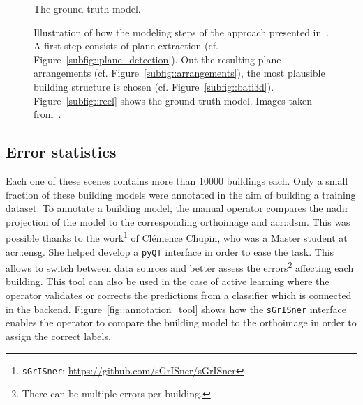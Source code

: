 \begin{figure}[htb]
{\begin{subfloatrow}
{                    }{
                        \caption{
                            \label{subfig::reel}
                            The ground truth model.
                        }
                    }
                \end{subfloatrow}
            }{
                \caption[
                    Illustration of how the modeling steps of the approach presented in~\parencite{durupt2006automatic}.
                ]{
                    \label{fig::method_modeling}
                    Illustration of how the modeling steps of the approach presented in~\parencite{durupt2006automatic}.
                    A first step consists of plane extraction (cf. Figure~\ref{subfig::plane_detection}).
                    Out the resulting plane arrangements (cf. Figure~\ref{subfig::arrangements}), the most plausible building structure is chosen (cf. Figure~\ref{subfig::bati3d}).
                    Figure~\ref{subfig::reel} shows the ground truth model.
                    Images taken from~\parencite{bredif20103d}.
                }
            }
        \end{figure}

    \subsection{Error statistics}
        \label{subsec::experiments::datasets::stats}
        Each one of these scenes contains more than \num{10000} buildings each.
        Only a small fraction of these building models were annotated in the aim of building a training dataset.
        To annotate a building model, the manual operator compares the nadir projection of the model to the corresponding orthoimage and \gls{acr::dsm}.
        This was possible thanks to the work\footnote{\verb!sGrISner!: \href{https://github.com/CHUPClem/sGrISner}{\url{https://github.com/sGrISner/sGrISner}}} of Clémence Chupin, who was a Master student at \gls{acr::ensg}.
        She helped develop a \verb!pyQT! interface in order to ease the task.
        This allows to switch between data sources and better assess the errors\footnote{There can be multiple errors per building.} affecting each building.
        This tool can also be used in the case of active learning where the operator validates or corrects the predictions from a classifier which is connected in the backend.
        Figure~\ref{fig::annotation_tool} shows how the \verb!sGrISner! interface enables the operator to compare the building model to the orthoimage in order to assign the correct labels.\\

